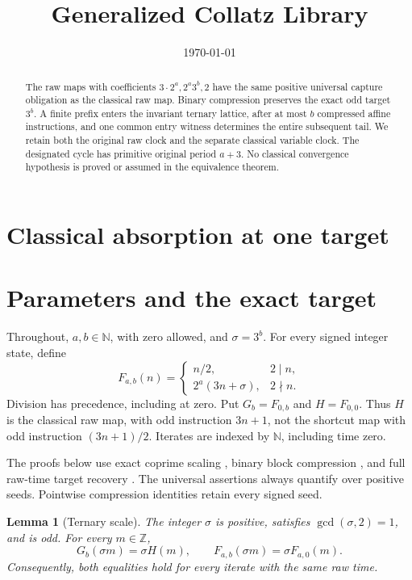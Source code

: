 \documentclass[11pt,letterpaper]{article}
\title{Generalized Collatz Library}
\author{}
\date{\today}
\newcommand{\N}{\mathbb{N}}
\newcommand{\Z}{\mathbb{Z}}
\newtheorem{lemma}[theorem]{Lemma}
\begin{document}
\maketitle
\section*{Classical absorption at one target}

\begin{abstract}
The raw maps with coefficients \(3\cdot2^a,2^a3^b,2\) have the same
positive universal capture obligation as the classical raw map.
Binary compression preserves the exact odd target \(3^b\).
A finite prefix enters the invariant ternary lattice, after at most \(b\)
compressed affine instructions, and one common entry witness determines
the entire subsequent tail. We retain both the original raw clock and
the separate classical variable clock. The designated cycle has
primitive original period \(a+3\). No classical convergence hypothesis
is proved or assumed in the equivalence theorem.
\end{abstract}

\section{Parameters and the exact target}

Throughout, \(a,b\in\N\), with zero allowed, and \(\sigma=3^b\).
For every signed integer state, define
\[
F_{a,b}(n)=
\begin{cases}
n/2,&2\mid n,\\
2^a(3n+\sigma),&2\nmid n.
\end{cases}
\]
Division has precedence, including at zero. Put \(G_b=F_{0,b}\) and
\(H=F_{0,0}\). Thus \(H\) is the classical raw map, with odd instruction
\(3n+1\), not the shortcut map with odd instruction \((3n+1)/2\).
Iterates are indexed by \(\N\), including time zero.

The proofs below use exact coprime scaling
\cite{AscendScaling}, binary block compression \cite{AscendCompressionI},
and full raw-time target recovery \cite{AscendCompressionII}.
The universal assertions always quantify over positive seeds.
Pointwise compression identities retain every signed seed.

\begin{lemma}[Ternary scale]\label{ScaleOdd}
The integer \(\sigma\) is positive, satisfies \(\gcd(\sigma,2)=1\), and is odd.
For every \(m\in\Z\),
\[
G_b(\sigma m)=\sigma H(m),
\qquad
F_{a,b}(\sigma m)=\sigma F_{a,0}(m).
\]
Consequently, both equalities hold for every iterate with the same raw time.
\end{lemma}
\end{document}
